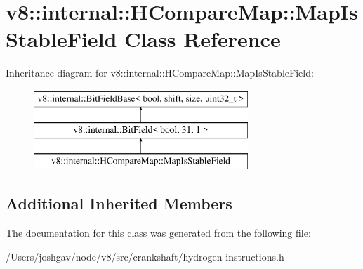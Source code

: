 \hypertarget{classv8_1_1internal_1_1_h_compare_map_1_1_map_is_stable_field}{}\section{v8\+:\+:internal\+:\+:H\+Compare\+Map\+:\+:Map\+Is\+Stable\+Field Class Reference}
\label{classv8_1_1internal_1_1_h_compare_map_1_1_map_is_stable_field}
Inheritance diagram for v8\+:\+:internal\+:\+:H\+Compare\+Map\+:\+:Map\+Is\+Stable\+Field\+:\begin{figure}[H]
\begin{center}
\leavevmode
\includegraphics[height=3.000000cm]{classv8_1_1internal_1_1_h_compare_map_1_1_map_is_stable_field}
\end{center}
\end{figure}
\subsection*{Additional Inherited Members}


The documentation for this class was generated from the following file\+:\begin{DoxyCompactItemize}
\item 
/\+Users/joshgav/node/v8/src/crankshaft/hydrogen-\/instructions.\+h\end{DoxyCompactItemize}
